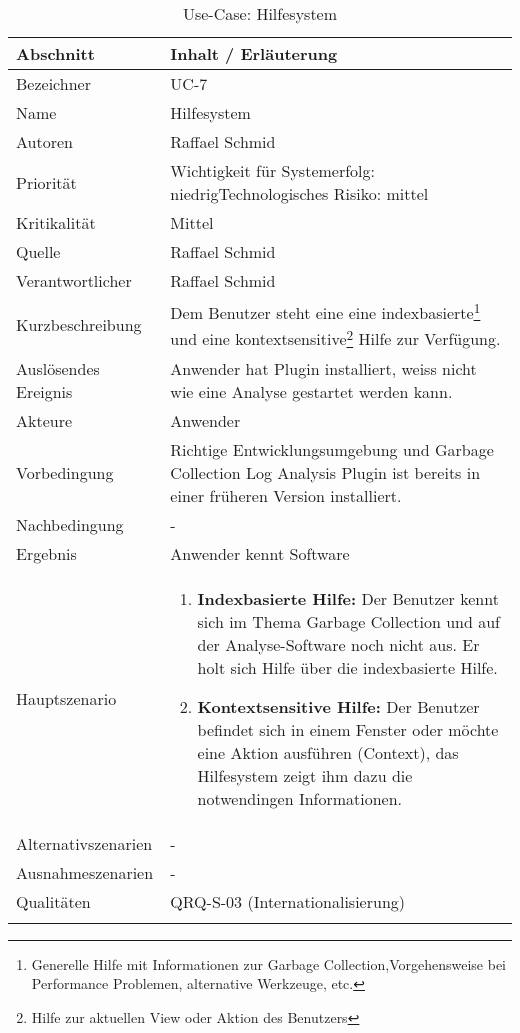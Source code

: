 \begin{longtable}{|p{4cm}|p{10.5cm}|}
\hline
   \textbf{Abschnitt} & \textbf{Inhalt / Erläuterung} \\\hline
   Bezeichner & UC-7\\\hline
   Name & Hilfesystem\\\hline
   Autoren & Raffael Schmid\\\hline
   Priorität & Wichtigkeit für Systemerfolg: niedrig\newline Technologisches Risiko: mittel\\\hline
   Kritikalität & Mittel\\\hline
   Quelle & Raffael Schmid\\\hline
   Verantwortlicher & Raffael Schmid\\\hline
   Kurzbeschreibung & Dem Benutzer steht eine eine indexbasierte\footnote{Generelle Hilfe mit Informationen zur Garbage Collection,Vorgehensweise bei Performance Problemen, alternative Werkzeuge, etc.} und eine kontextsensitive\footnote{Hilfe zur aktuellen View oder Aktion des Benutzers} Hilfe zur Verfügung. \\\hline
   Auslösendes Ereignis & Anwender hat Plugin installiert, weiss nicht wie eine Analyse gestartet werden kann.\\\hline
   Akteure & Anwender\\\hline
   Vorbedingung & Richtige Entwicklungsumgebung und Garbage Collection Log Analysis Plugin ist bereits in einer früheren Version installiert.\\\hline
   Nachbedingung & -\\\hline
   Ergebnis & Anwender kennt Software\\\hline
   Hauptszenario &	\begin{enumerate}
		\item \textbf{Indexbasierte Hilfe: } Der Benutzer kennt sich im Thema Garbage Collection und auf der Analyse-Software noch nicht aus. Er holt sich Hilfe über die indexbasierte Hilfe. 
		\item \textbf{Kontextsensitive Hilfe: } Der Benutzer befindet sich in einem Fenster oder möchte eine Aktion ausführen (Context), das Hilfesystem zeigt ihm dazu die notwendingen Informationen.
	\end{enumerate}
	\\\hline
   Alternativszenarien & -\\\hline
   Ausnahmeszenarien & -\\\hline
   Qualitäten & QRQ-S-03 (Internationalisierung)\\\hline
\caption{Use-Case: Hilfesystem}
\end{longtable}

